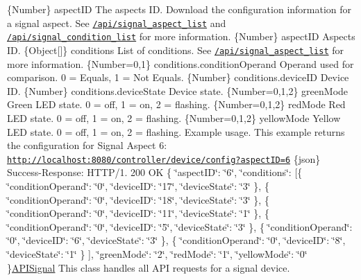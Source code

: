 \{Number\} aspect\+ID The aspect\textquotesingle{}s ID.  Download the configuration information for a signal aspect. See \href{#api-Signal-SignalAspectList}{\tt /api/signal\+\_\+aspect\+\_\+list} and \href{#api-Signal-SignalAspectConditionList}{\tt /api/signal\+\_\+condition\+\_\+list} for more information.  \{Number\} aspect\+ID Aspect\textquotesingle{}s ID.  \{Object\mbox{[}\mbox{]}\} conditions List of conditions. See \href{#api-Signal-SignalAspectList}{\tt /api/signal\+\_\+aspect\+\_\+list} for more information.  \{Number=0,1\} conditions.\+condition\+Operand Operand used for comparison. 0 = Equals, 1 = Not Equals.  \{Number\} conditions.\+device\+ID Device ID.  \{Number\} conditions.\+device\+State Device state.  \{Number=0,1,2\} green\+Mode Green L\+ED state. 0 = off, 1 = on, 2 = flashing.  \{Number=0,1,2\} red\+Mode Red L\+ED state. 0 = off, 1 = on, 2 = flashing.  \{Number=0,1,2\} yellow\+Mode Yellow L\+ED state. 0 = off, 1 = on, 2 = flashing.  Example usage. This example returns the configuration for Signal Aspect 6\+: \href{http://localhost:8080/controller/device/config?aspectID=6}{\tt http\+://localhost\+:8080/controller/device/config?aspect\+I\+D=6}  \{json\} Success-\/\+Response\+: H\+T\+T\+P/1. 200 OK \{ \char`\"{}aspect\+I\+D\char`\"{}\+: \char`\"{}6\char`\"{}, \char`\"{}conditions\char`\"{}\+: \mbox{[}\{ \char`\"{}condition\+Operand\char`\"{}\+: \char`\"{}0\char`\"{}, \char`\"{}device\+I\+D\char`\"{}\+: \char`\"{}17\char`\"{}, \char`\"{}device\+State\char`\"{}\+: \char`\"{}3\char`\"{} \}, \{ \char`\"{}condition\+Operand\char`\"{}\+: \char`\"{}0\char`\"{}, \char`\"{}device\+I\+D\char`\"{}\+: \char`\"{}18\char`\"{}, \char`\"{}device\+State\char`\"{}\+: \char`\"{}3\char`\"{} \}, \{ \char`\"{}condition\+Operand\char`\"{}\+: \char`\"{}0\char`\"{}, \char`\"{}device\+I\+D\char`\"{}\+: \char`\"{}11\char`\"{}, \char`\"{}device\+State\char`\"{}\+: \char`\"{}1\char`\"{} \}, \{ \char`\"{}condition\+Operand\char`\"{}\+: \char`\"{}0\char`\"{}, \char`\"{}device\+I\+D\char`\"{}\+: \char`\"{}5\char`\"{}, \char`\"{}device\+State\char`\"{}\+: \char`\"{}3\char`\"{} \}, \{ \char`\"{}condition\+Operand\char`\"{}\+: \char`\"{}0\char`\"{}, \char`\"{}device\+I\+D\char`\"{}\+: \char`\"{}6\char`\"{}, \char`\"{}device\+State\char`\"{}\+: \char`\"{}3\char`\"{} \}, \{ \char`\"{}condition\+Operand\char`\"{}\+: \char`\"{}0\char`\"{}, \char`\"{}device\+I\+D\char`\"{}\+: \char`\"{}8\char`\"{}, \char`\"{}device\+State\char`\"{}\+: \char`\"{}1\char`\"{} \} \mbox{]}, \char`\"{}green\+Mode\char`\"{}\+: \char`\"{}2\char`\"{}, \char`\"{}red\+Mode\char`\"{}\+: \char`\"{}1\char`\"{}, \char`\"{}yellow\+Mode\char`\"{}\+: \char`\"{}0\char`\"{} \}\hyperlink{class_a_p_i_signal}{A\+P\+I\+Signal} This class handles all A\+PI requests for a signal device. 

